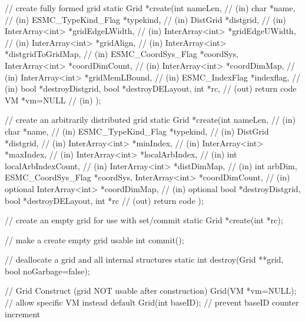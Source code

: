 {{   // create fully formed grid
  static Grid *create(int nameLen,                                // (in)
            char *name,                                 // (in)
            ESMC_TypeKind_Flag *typekind,                    // (in)
            DistGrid *distgrid,                  // (in)
            InterArray<int> *gridEdgeLWidth,          // (in)
            InterArray<int> *gridEdgeUWidth,          // (in)
            InterArray<int> *gridAlign,          // (in)
            InterArray<int> *distgridToGridMap,                  // (in)
                      ESMC_CoordSys_Flag *coordSys, 
            InterArray<int> *coordDimCount,              // (in)
            InterArray<int> *coordDimMap,             // (in)
            InterArray<int> *gridMemLBound,          // (in)
            ESMC_IndexFlag *indexflag,                  // (in)
            bool *destroyDistgrid,
            bool *destroyDELayout,
            int *rc,                                     // (out) return code
                VM *vm=NULL                          // (in)
            );
 
  // create an arbitrarily distributed grid
  static Grid *create(int nameLen,                                // (in)
            char *name,                                 // (in)
            ESMC_TypeKind_Flag *typekind,                    // (in)
            DistGrid *distgrid,                  // (in)
            InterArray<int> *minIndex,              // (in)
            InterArray<int> *maxIndex,              // (in)
            InterArray<int> *localArbIndex,          // (in)
                int localArbIndexCount,                  // (in)
            InterArray<int> *distDimMap,                  // (in)
            int arbDim,
                ESMC_CoordSys_Flag *coordSys,
              InterArray<int> *coordDimCount,       // (in) optional
                InterArray<int> *coordDimMap,         // (in) optional
                bool *destroyDistgrid,
            bool *destroyDELayout,
            int *rc                               // (out) return code
            );
 
  // create an empty grid for use with set/commit
   static Grid *create(int *rc);
 
 
   // make a create empty grid usable
   int commit();
 
 
   // deallocate a grid and all internal structures
   static int destroy(Grid **grid, bool noGarbage=false);
 
   // Grid Construct (grid NOT usable after construction)
   Grid(VM *vm=NULL);  // allow specific VM instead default
   Grid(int baseID);   // prevent baseID counter increment
 
}}
